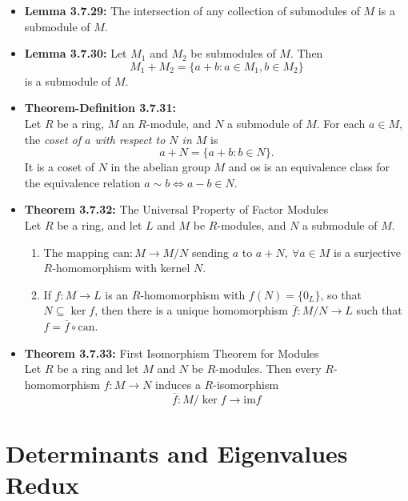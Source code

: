 \documentclass[11pt,a4paper]{article}
\begin{document}
\begin{itemize}
    \item \textbf{Lemma 3.7.29:} The intersection of any collection of submodules of $M$ is a
        submodule of $M$.

    \item \textbf{Lemma 3.7.30:} Let $M_1$ and $M_2$ be submodules of $M$.
        Then
        \[
            M_1 + M_2 = \{ a + b : a \in M_1, b \in M_2 \}
        \]
        is a submodule of $M$.

    \item \textbf{Theorem-Definition 3.7.31:} \\
        Let $R$ be a ring, $M$ an $R$-module, and $N$ a submodule of $M$.
        For each $a \in M$, the \emph{coset of $a$ with respect to $N$ in $M$} is
        \[
            a + N = \{ a + b : b \in N \}.
        \]
        It is a coset of $N$ in the abelian group $M$ and os is an equivalence class for the
        equivalence relation $a \sim b \iff a-b \in N$.

    \item \textbf{Theorem 3.7.32:} The Universal Property of Factor Modules \\
        Let $R$ be a ring, and let $L$ and $M$ be $R$-modules, and $N$ a submodule of $M$.
        \begin{enumerate}
            \item The mapping $\mathrm{can} : M \to M/N$ sending $a$ to $a+N, \ \forall a \in M$
                is a surjective $R$-homomorphism with kernel $N$.
            \item If $f : M \to L$ is an $R$-homomorphism with $f(N) = \{0_L\}$,
                so that $N \subseteq \ker f$,
                then there is a unique homomorphism $\overline{f} : M/N \to L$
                such that $f = \overline{f} \circ \mathrm{can}$.
        \end{enumerate}

    \item \textbf{Theorem 3.7.33:} First Isomorphism Theorem for Modules \\
        Let $R$ be a ring and let $M$ and $N$ be $R$-modules.
        Then every $R$-homomorphism $f : M \to N$ induces a $R$-isomorphism
        \[
            \overline{f} : M / \ker f \to \mathrm{im} f
        \]
\end{itemize}

\section{Determinants and Eigenvalues Redux}
\end{document}
